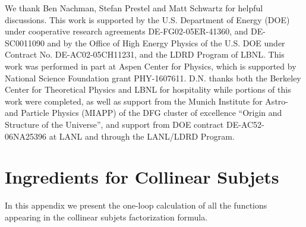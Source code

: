 \documentclass[a4paper,11pt]{article}
\begin{document}
\begin{acknowledgments}
We thank Ben Nachman, Stefan Prestel and Matt Schwartz for helpful discussions. This work is supported by the U.S. Department of Energy (DOE) under cooperative research agreements DE-FG02-05ER-41360, and DE-SC0011090 and by the Office of High Energy Physics of the U.S. DOE under Contract No. DE-AC02-05CH11231, and the LDRD Program of LBNL. This work was performed in part at Aspen Center for Physics, which is supported by National Science Foundation grant PHY-1607611. D.N. thanks both the Berkeley Center for Theoretical Physics and LBNL for hospitality while portions of this work were completed, as well as support from the Munich Institute for Astro- and Particle Physics (MIAPP) of the DFG cluster of excellence ``Origin and Structure of the Universe'', and support from DOE contract DE-AC52-06NA25396 at LANL and through the LANL/LDRD Program.
\end{acknowledgments}

\appendix

\section{Ingredients for Collinear Subjets}\label{app:collinear_sub}

In this appendix we present the one-loop calculation of all the functions appearing in the collinear subjets factorization formula.

\end{document}
